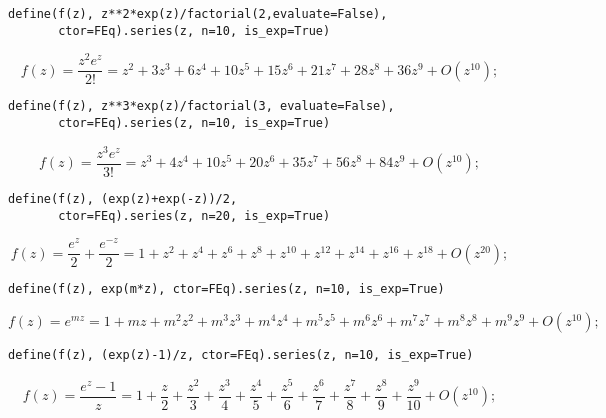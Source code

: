 \begin{verbatim}
define(f(z), z**2*exp(z)/factorial(2,evaluate=False),
       ctor=FEq).series(z, n=10, is_exp=True)
\end{verbatim}
\begin{displaymath}
f{\left (z \right )} = \frac{z^{2} e^{z}}{2!} = z^{2} + 3 z^{3} + 6 z^{4} + 10 z^{5} + 15 z^{6} + 21 z^{7} + 28 z^{8} + 36 z^{9} + O\left(z^{10}\right);
\end{displaymath}

\begin{verbatim}
define(f(z), z**3*exp(z)/factorial(3, evaluate=False),
       ctor=FEq).series(z, n=10, is_exp=True)
\end{verbatim}
\begin{displaymath}
f{\left (z \right )} = \frac{z^{3} e^{z}}{3!} = z^{3} + 4 z^{4} + 10 z^{5} + 20 z^{6} + 35 z^{7} + 56 z^{8} + 84 z^{9} + O\left(z^{10}\right);
\end{displaymath}

\begin{verbatim}
define(f(z), (exp(z)+exp(-z))/2,
       ctor=FEq).series(z, n=20, is_exp=True)
\end{verbatim}
\begin{displaymath}
f{\left (z \right )} = \frac{e^{z}}{2} + \frac{e^{- z}}{2} = 1 + z^{2} + z^{4} + z^{6} + z^{8} + z^{10} + z^{12} + z^{14} + z^{16} + z^{18} + O\left(z^{20}\right);
\end{displaymath}

\begin{verbatim}
define(f(z), exp(m*z), ctor=FEq).series(z, n=10, is_exp=True)
\end{verbatim}
\begin{displaymath}
f{\left (z \right )} = e^{m z} = 1 + m z + m^{2} z^{2} + m^{3} z^{3} + m^{4} z^{4} + m^{5} z^{5} + m^{6} z^{6} + m^{7} z^{7} + m^{8} z^{8} + m^{9} z^{9} + O\left(z^{10}\right);
\end{displaymath}

\begin{verbatim}
define(f(z), (exp(z)-1)/z, ctor=FEq).series(z, n=10, is_exp=True)
\end{verbatim}
\begin{displaymath}
f{\left (z \right )} = \frac{e^{z} - 1}{z} = 1 + \frac{z}{2} + \frac{z^{2}}{3} + \frac{z^{3}}{4} + \frac{z^{4}}{5} + \frac{z^{5}}{6} + \frac{z^{6}}{7} + \frac{z^{7}}{8} + \frac{z^{8}}{9} + \frac{z^{9}}{10} + O\left(z^{10}\right);
\end{displaymath}

